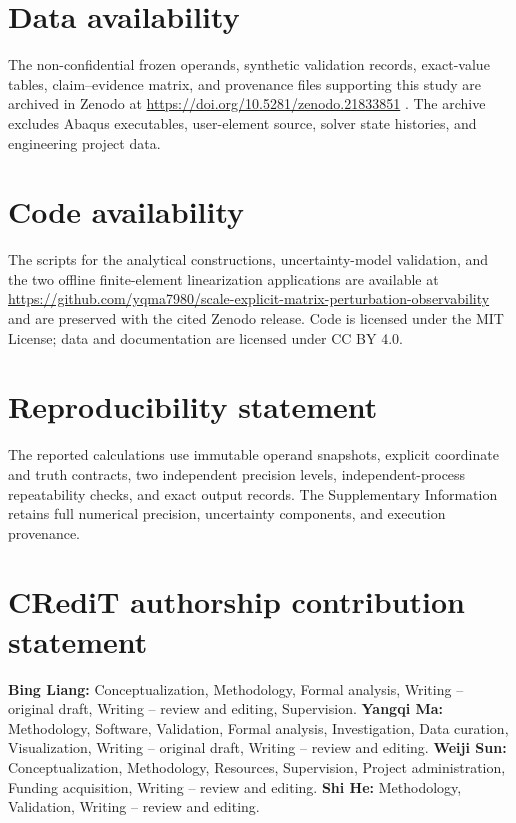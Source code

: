\documentclass[preprint,12pt]{elsarticle}
\begin{document}
\section*{Data availability}
The non-confidential frozen operands, synthetic validation records, exact-value tables, claim--evidence matrix, and provenance files supporting this study are archived in Zenodo at \href{https://doi.org/10.5281/zenodo.21833851}{https://doi.org/10.5281/zenodo.21833851} \cite{liang2026artifact}. The archive excludes Abaqus executables, user-element source, solver state histories, and engineering project data.

\section*{Code availability}
The scripts for the analytical constructions, uncertainty-model validation, and the two offline finite-element linearization applications are available at \href{https://github.com/yqma7980/scale-explicit-matrix-perturbation-observability}{https://github.com/yqma7980/scale-explicit-matrix-perturbation-observability} and are preserved with the cited Zenodo release. Code is licensed under the MIT License; data and documentation are licensed under CC BY 4.0.

\section*{Reproducibility statement}
The reported calculations use immutable operand snapshots, explicit coordinate and truth contracts, two independent precision levels, independent-process repeatability checks, and exact output records. The Supplementary Information retains full numerical precision, uncertainty components, and execution provenance.

\section*{CRediT authorship contribution statement}
\textbf{Bing Liang:} Conceptualization, Methodology, Formal analysis, Writing -- original draft, Writing -- review and editing, Supervision. \textbf{Yangqi Ma:} Methodology, Software, Validation, Formal analysis, Investigation, Data curation, Visualization, Writing -- original draft, Writing -- review and editing. \textbf{Weiji Sun:} Conceptualization, Methodology, Resources, Supervision, Project administration, Funding acquisition, Writing -- review and editing. \textbf{Shi He:} Methodology, Validation, Writing -- review and editing.
\end{document}
